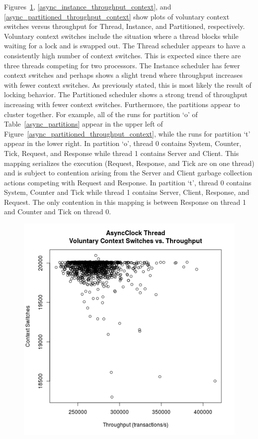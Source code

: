 Figures~\ref{async_thread_throughput_context}, \ref{async_instance_throughput_context}, and \ref{async_partitioned_throughput_context} show plots of voluntary context switches versus throughput for Thread, Instance, and Partitioned, respectively.
Voluntary context switches include the situation where a thread blocks while waiting for a lock and is swapped out.
The Thread scheduler appears to have a consistently high number of context switches.
This is expected since there are three threads competing for two processors.
The Instance scheduler has fewer context switches and perhaps shows a slight trend where throughput increases with fewer context switches.
As previously stated, this is most likely the result of locking behavior.
The Partitioned scheduler shows a strong trend of throughput increasing with fewer context switches.
Furthermore, the partitions appear to cluster together.
For example, all of the runs for partition `o' of Table~\ref{async_partitions} appear in the upper left of Figure~\ref{async_partitioned_throughput_context}, while the runs for partition `t' appear in the lower right.
In partition `o', thread 0 contains System, Counter, Tick, Request, and Response while thread 1 contains Server and Client.
This mapping serializes the execution (Request, Response, and Tick are on one thread) and is subject to contention arising from the Server and Client garbage collection actions competing with Request and Response.
In partition `t', thread 0 contains System, Counter and Tick while thread 1 contains Server, Client, Response, and Request.
The only contention in this mapping is between Response on thread 1 and Counter and Tick on thread 0.

\begin{figure}
\center
\includegraphics[height=.4\textheight]{async_thread_throughput_context.png}
\caption{\label{async_thread_throughput_context}}
\end{figure}

